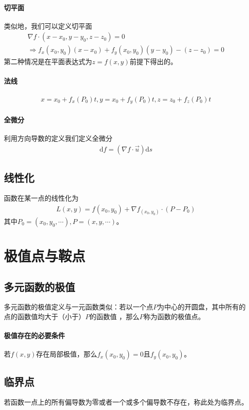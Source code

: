 \documentclass[12pt,a4paper,UTF8]{ctexbook}
\theoremstyle{plain}
\begin{document}
\paragraph{切平面}
类似地，我们可以定义切平面
\begin{align*}
    &\nabla f \cdot (x-x_0,y-y_0,z-z_0)=0&\\
    &\Rightarrow f_x(x_0,y_0)(x-x_0)+f_y(x_0,y_0)(y-y_0)-(z-z_0)=0&
\end{align*}
第二种情况是在平面表达式为$z=f(x,y)$前提下得出的。
\paragraph{法线}
\begin{align*}
    x=x_0+f_x(P_0)t,y=x_0+f_y(P_0)t,z=z_0+f_z(P_0)t
\end{align*}
\paragraph{全微分}
利用方向导数的定义我们定义全微分
\begin{align*}
    \mathrm df=(\nabla f\cdot \vec u)\mathrm d s
\end{align*} 
\subsection{线性化}
函数在某一点的线性化为
\begin{align*} 
    L(x,y)=f(x_0,y_0)+\nabla f_{(x_0,y_0)}\cdot (P-P_0)
\end{align*}
其中$P_0=(x_0,y_0,\cdots),P=(x,y,\cdots)$。
\section{极值点与鞍点}
\subsection{多元函数的极值}
多元函数的极值定义与一元函数类似：若以一个点$P$为中心的开圆盘，其中所有的点的函数值均大于（小于）$P$的函数值
，那么$P$称为函数的极值点。
\paragraph{极值存在的必要条件}若$f(x,y)$存在局部极值，那么$f_x(x_0,y_0)=0$且$f_y(x_0,y_0)$。
\subsection{临界点}
若函数一点上的所有偏导数为零或者一个或多个偏导数不存在，称此处为临界点。
\end{document}
